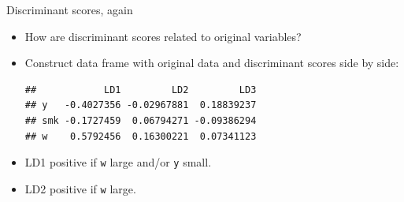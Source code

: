 \begin{frame}[fragile]{Discriminant scores, again}
  
  \begin{itemize}
  \item How are discriminant scores related to original variables?
  \item Construct data frame with original data and discriminant
    scores side by side:
\begin{knitrout}
\color{fgcolor}\begin{kframe}
\begin{alltt}
\hlopt{$}
\end{alltt}
\begin{verbatim}
##            LD1         LD2         LD3
## y   -0.4027356 -0.02967881  0.18839237
## smk -0.1727459  0.06794271 -0.09386294
## w    0.5792456  0.16300221  0.07341123
\end{verbatim}
\begin{alltt}
\hlkwb{=}
  \hlopt{$}
\end{alltt}
\end{kframe}
\end{knitrout}
\item LD1 positive if \texttt{w} large and/or \texttt{y} small.
\item LD2 positive if \texttt{w} large.    
    
  \end{itemize}

\end{frame}

